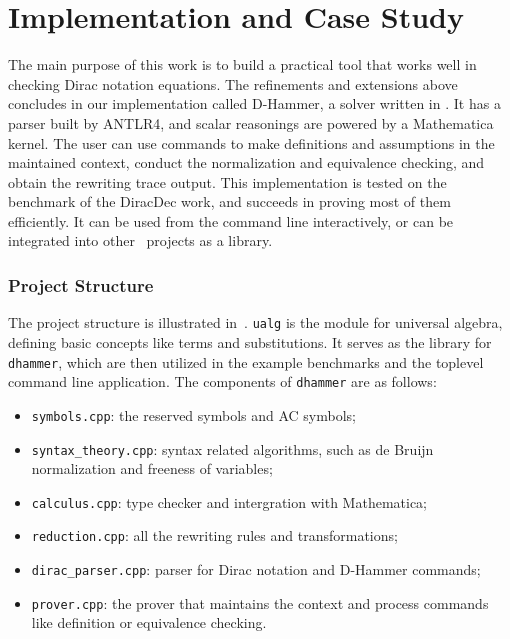 
\section{Implementation and Case Study}

The main purpose of this work is to build a practical tool that works well in checking Dirac notation equations. The refinements and extensions above concludes in our implementation called D-Hammer, a solver written in \CC. It has a parser built by ANTLR4, and scalar reasonings are powered by a Mathematica kernel. The user can use commands to make definitions and assumptions in the maintained context, conduct the normalization and equivalence checking, and obtain the rewriting trace output. This implementation 
is tested on the benchmark of the DiracDec work, and succeeds in proving most of them efficiently. 
It can be used from the command line interactively, or can be integrated into other \CC\ projects as a library.

\subsubsection{Project Structure}
The project structure is illustrated in~.
\texttt{ualg} is the module for universal algebra, defining basic concepts like terms and substitutions. It serves as the library for \texttt{dhammer}, which are then utilized in the example benchmarks and the toplevel command line application. The components of \texttt{dhammer} are as follows:
\begin{itemize}
    \item \texttt{symbols.cpp}: the reserved symbols and AC symbols;
    \item \texttt{syntax\_theory.cpp}: syntax related algorithms, such as de Bruijn normalization and freeness of variables;
    \item \texttt{calculus.cpp}: type checker and intergration with Mathematica;
    \item \texttt{reduction.cpp}: all the rewriting rules and transformations;
    \item \texttt{dirac\_parser.cpp}: parser for Dirac notation and D-Hammer commands;
    \item \texttt{prover.cpp}: the prover that maintains the context and process commands like definition or equivalence checking.
\end{itemize}



